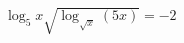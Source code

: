 \begin{ex}[type=equation]
	\begin{condition}
		$\log_5 x\sqrt{\log_{\sqrt{x} } (5x)} = -2$
	\end{condition}
\end{ex}